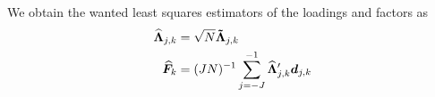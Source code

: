 \documentclass[main_document.tex]{subfiles}
\begin{document}
We obtain the wanted least squares estimators of the loadings and factors as 
\begin{align}
	\estimLoadings{j}{k} &= \sqrt{N}\bm{\tilde{\Lambda}}_{j,k} \label{eq:estimatorLoadings}\\
	\estimFactors{k} &= (JN)^{-1} \scalesum{j} \estimLoadings{j}{k}' \coeffs{j}{k} \label{eq:estimatorFactors}
\end{align}
\end{document}
